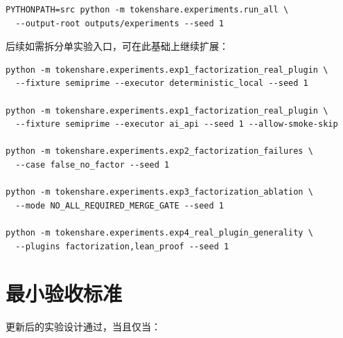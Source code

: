 \documentclass[11pt]{ctexart}
\begin{document}
\begin{lstlisting}
PYTHONPATH=src python -m tokenshare.experiments.run_all \
  --output-root outputs/experiments --seed 1
\end{lstlisting}

后续如需拆分单实验入口，可在此基础上继续扩展：

\begin{lstlisting}
python -m tokenshare.experiments.exp1_factorization_real_plugin \
  --fixture semiprime --executor deterministic_local --seed 1

python -m tokenshare.experiments.exp1_factorization_real_plugin \
  --fixture semiprime --executor ai_api --seed 1 --allow-smoke-skip

python -m tokenshare.experiments.exp2_factorization_failures \
  --case false_no_factor --seed 1

python -m tokenshare.experiments.exp3_factorization_ablation \
  --mode NO_ALL_REQUIRED_MERGE_GATE --seed 1

python -m tokenshare.experiments.exp4_real_plugin_generality \
  --plugins factorization,lean_proof --seed 1
\end{lstlisting}

\section{最小验收标准}

更新后的实验设计通过，当且仅当：
\end{document}
